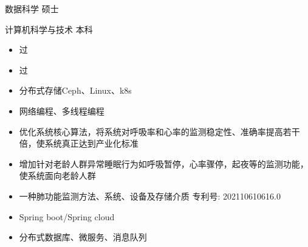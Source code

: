 
数据科学 \quad 硕士

计算机科学与技术 \quad 本科 



\begin{itemize}[topsep=0pt,itemsep=0pt,parsep=0pt,partopsep=0pt]
  \item 过
  \item 过
\end{itemize}

\begin{itemize}[topsep=0pt,itemsep=0pt,parsep=0pt,partopsep=0pt]
  \item 分布式存储Ceph、Linux、k8s
  \item 网络编程、多线程编程
 \end{itemize}



\begin{itemize}[topsep=0pt,itemsep=0pt,parsep=0pt,partopsep=0pt]
  \item 优化系统核心算法，将系统对呼吸率和心率的监测稳定性、准确率提高若干倍，使系统真正达到产业化标准
  \item 增加针对老龄人群异常睡眠行为如呼吸暂停，心率骤停，起夜等的监测功能，使系统面向老龄人群
  \item 一种肺功能监测方法、系统、设备及存储介质 \quad 专利号: 202110610616.0 
\end{itemize}

\begin{itemize}[topsep=0pt,itemsep=0pt,parsep=0pt,partopsep=0pt]
  \item Spring boot/Spring cloud
  \item 分布式数据库、微服务、消息队列
\end{itemize}

